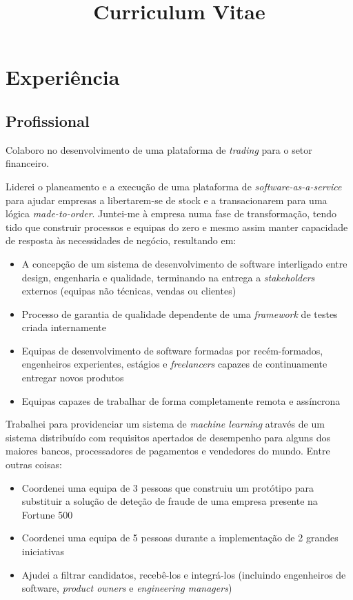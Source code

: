 \documentclass[11pt,a4paper]{moderncv}
\title{Curriculum Vitae}
\begin{document}
\maketitle

\vspace{-10mm}

\section{Experiência}
\vspace{-2mm}
\subsection{Profissional}
{Colaboro no desenvolvimento de uma plataforma de \textit{trading} para o setor financeiro.}
{Liderei o planeamento e a execução de uma plataforma de \textit{software-as-a-service} para ajudar empresas a libertarem-se de stock e a transacionarem para uma lógica \textit{made-to-order}. Juntei-me à empresa numa fase de transformação, tendo tido que construir processos e equipas do zero e mesmo assim manter capacidade de resposta às necessidades de negócio, resultando em:
\begin{itemize}
  \item A concepção de um sistema de desenvolvimento de software interligado entre design, engenharia e qualidade, terminando na entrega a \textit{stakeholders} externos (equipas não técnicas, vendas ou clientes)
  \item Processo de garantia de qualidade dependente de uma \textit{framework} de testes criada internamente
  \item Equipas de desenvolvimento de software formadas por recém-formados, engenheiros experientes, estágios e \textit{freelancers} capazes de continuamente entregar novos produtos
  \item Equipas capazes de trabalhar de forma completamente remota e assíncrona
\end{itemize}}
{Trabalhei para providenciar um sistema de \textit{machine learning} através de um sistema distribuído com requisitos apertados de desempenho para alguns dos maiores bancos, processadores de pagamentos e vendedores do mundo. Entre outras coisas:
\begin{itemize}
  \item Coordenei uma equipa de 3 pessoas que construiu um protótipo para substituir a solução de deteção de fraude de uma empresa presente na Fortune 500
  \item Coordenei uma equipa de 5 pessoas durante a implementação de 2 grandes iniciativas
  \item Ajudei a filtrar candidatos, recebê-los e integrá-los (incluindo engenheiros de software, \textit{product owners} e \textit{engineering managers})
\end{itemize}}
\end{document}
